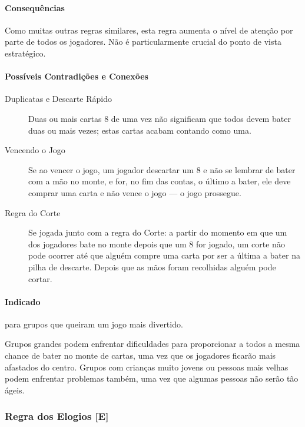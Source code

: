 \paragraph{Consequências}

Como muitas outras regras similares, esta regra aumenta o nível de atenção por parte de todos os jogadores. Não é particularmente crucial do ponto de vista estratégico.

\paragraph{Possíveis Contradições e Conexões}

\begin{description}
\item[Duplicatas e Descarte Rápido]{Duas ou mais cartas 8 de uma vez não significam que todos devem bater duas ou mais vezes; estas cartas acabam contando como uma.}
\item[Vencendo o Jogo]{Se ao vencer o jogo, um jogador descartar um 8 e não se lembrar de bater com a mão no monte, e for, no fim das contas, o último a bater, ele deve comprar uma carta e não vence o jogo --- o jogo prossegue.}
\item[Regra do Corte]{Se jogada junto com a regra do Corte: a partir do momento em que um dos jogadores bate no monte depois que um 8 for jogado, um corte não pode ocorrer até que alguém compre uma carta por ser a última a bater na pilha de descarte. Depois que as mãos foram recolhidas alguém pode cortar.}
\end{description}

\paragraph{Indicado} 

para grupos que queiram um jogo mais divertido.

Grupos grandes podem enfrentar dificuldades para proporcionar a todos a mesma chance de bater no monte de cartas, uma vez que os jogadores ficarão mais afastados do centro. Grupos com crianças muito jovens ou pessoas mais velhas podem enfrentar problemas também, uma vez que algumas pessoas não serão tão ágeis.

\subsubsection{Regra dos Elogios [E]}

\label{elogios}

